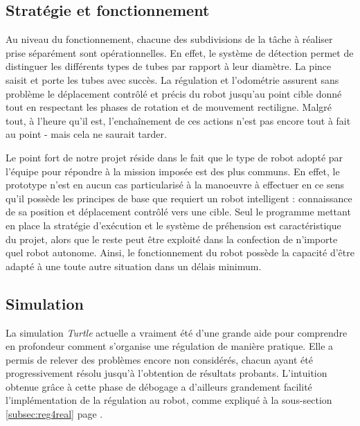 \documentclass[a4paper,11pt]{article}
\begin{document}
\subsection{Stratégie et fonctionnement}
Au niveau du fonctionnement, chacune des subdivisions de la tâche à réaliser prise séparément sont opérationnelles. En effet, le système de détection permet de distinguer les différents types de tubes par rapport à leur diamètre. La pince saisit et porte les tubes avec succès. La régulation et l'odométrie assurent sans problème le déplacement contrôlé et précis du robot jusqu'au point cible donné tout en respectant les phases de rotation et de mouvement rectiligne. Malgré tout, à l'heure qu'il est, l'enchaînement de ces actions n'est pas encore tout à fait au point - mais cela ne saurait tarder.

Le point fort de notre projet réside dans le fait que le type de robot adopté par l'équipe pour répondre à la mission imposée est des plus communs. En effet, le prototype n'est en aucun cas particularisé à la manoeuvre à effectuer en ce sens qu'il possède les principes de base que requiert un robot intelligent : connaissance de sa position et déplacement contrôlé vers une cible. Seul le programme mettant en place la stratégie d'exécution et le système de préhension est caractéristique du projet, alors que le reste peut être exploité dans la confection de n'importe quel robot autonome. Ainsi, le fonctionnement du robot possède la capacité d'être adapté à une toute autre situation dans un délais minimum.

\subsection{Simulation}

La simulation \textit{Turtle} actuelle a vraiment été d'une grande aide pour comprendre en profondeur comment s'organise une régulation de manière pratique. Elle a permis de relever des problèmes encore non considérés, chacun ayant été progressivement résolu jusqu'à l'obtention de résultats probants. L'intuition obtenue grâce à cette phase de débogage a d'ailleurs grandement facilité l'implémentation de la régulation au robot, comme expliqué à la sous-section \ref{subsec:reg4real} page \pageref{subsec:reg4real}.
\end{document}
